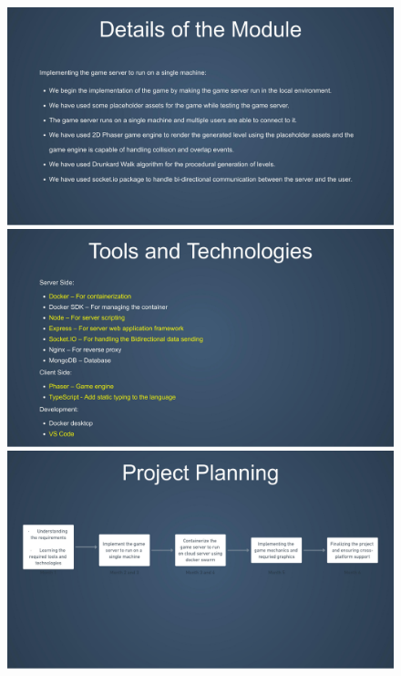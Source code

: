 \documentclass[oneside,12pt]{Classes/VTU}
\begin{document}
	\pagebreak
	\begin{figure}[ht!]
		\centering
		\includegraphics[scale=0.3]{0004.jpg}\vfill
		\includegraphics[scale=0.3]{0005.jpg}\vfill
		\includegraphics[scale=0.3]{0006.jpg}\vfill
	\end{figure}
\end{document}
